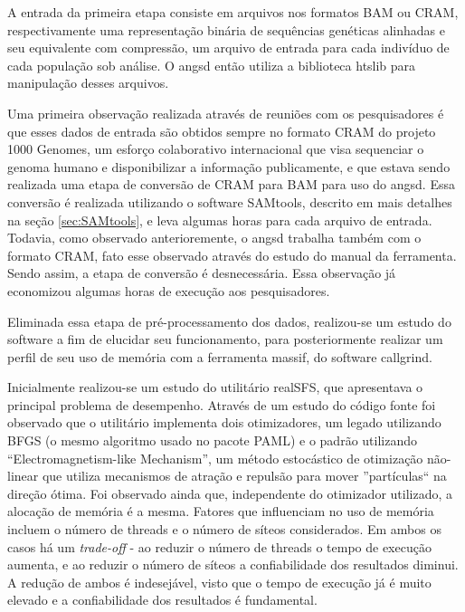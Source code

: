 \documentclass[cic,tc]{iiufrgs}
\begin{document}
A entrada da primeira etapa consiste em arquivos nos formatos BAM ou CRAM,
respectivamente uma representação binária de sequências genéticas alinhadas e
seu equivalente com compressão, um arquivo de entrada para cada indivíduo de
cada população sob análise. O angsd então utiliza a biblioteca
htslib\cite{bonfield2021htslib} para manipulação desses arquivos.

Uma primeira observação realizada através de reuniões com os pesquisadores é
que esses dados de entrada são obtidos sempre no formato CRAM do projeto 1000
Genomes, um esforço colaborativo internacional que visa sequenciar o genoma
humano e disponibilizar a informação publicamente,\cite{via20101000} e que
estava sendo realizada uma etapa de conversão de CRAM para BAM para uso do
angsd. Essa conversão é realizada utilizando o software SAMtools, descrito em
mais detalhes na seção \ref{sec:SAMtools}, e leva algumas horas para cada
arquivo de entrada. Todavia, como observado anterioremente, o angsd trabalha
também com o formato CRAM, fato esse observado através do estudo do manual da
ferramenta.  Sendo assim, a etapa de conversão é desnecessária. Essa observação
já economizou algumas horas de execução aos pesquisadores.

Eliminada essa etapa de pré-processamento dos dados, realizou-se um estudo do
software a fim de elucidar seu funcionamento, para posteriormente realizar um
perfil de seu uso de memória com a ferramenta massif, do software
callgrind.\cite{weidendorfer2008sequential}

Inicialmente realizou-se um estudo do utilitário realSFS, que apresentava o
principal problema de desempenho. Através de um estudo do código fonte foi
observado que o utilitário implementa dois otimizadores, um legado utilizando
BFGS (o mesmo algoritmo usado no pacote PAML) e o padrão utilizando
``Electromagnetism-like Mechanism'', um método estocástico de otimização
não-linear que utiliza mecanismos de atração e repulsão para mover
''partículas`` na direção ótima.\cite{5636954} Foi observado ainda que,
independente do otimizador utilizado, a alocação de memória é a mesma. Fatores
que influenciam no uso de memória incluem o número de threads e o número de
síteos considerados. Em ambos os casos há um \textit{trade-off} - ao reduzir o
número de threads o tempo de execução aumenta, e ao reduzir o número de síteos
a confiabilidade dos resultados diminui.\cite{popgen2016angsd} A redução de
ambos é indesejável, visto que o tempo de execução já é muito elevado e a
confiabilidade dos resultados é fundamental.
\end{document}
